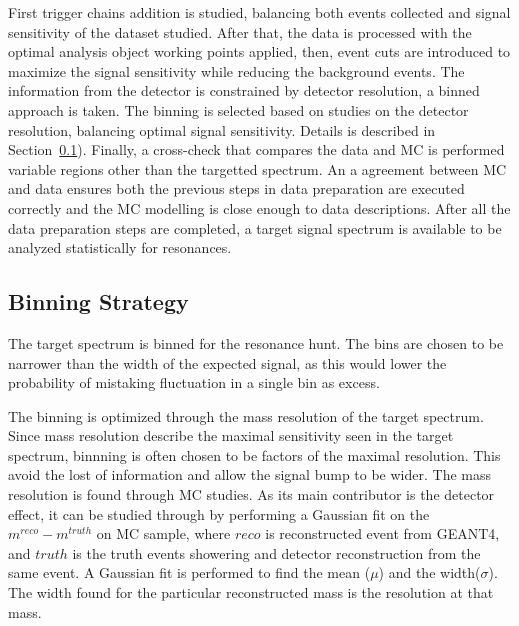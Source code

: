 First trigger chains addition is studied, balancing both events collected and signal sensitivity of the dataset studied. After that, the data is processed with the optimal analysis object working points applied, then, event cuts are introduced to maximize the signal sensitivity while reducing the background events. The information from the detector is constrained by detector resolution, a binned approach is taken. The binning is selected based on studies on the detector resolution, balancing optimal signal sensitivity. Details is described in Section~\ref{sec:binning}). Finally, a cross-check that compares the data and MC is performed variable regions other than the targetted spectrum. An a agreement between MC and data ensures both the previous steps in data preparation are executed correctly and the MC modelling is close enough to data descriptions. After all the data preparation steps are completed, a target signal spectrum is available to be analyzed statistically for resonances. 

\subsection{Binning Strategy} 
\label{sec:binning}

The target spectrum is binned for the resonance hunt. The bins are chosen to be narrower than the width of the expected signal, as this would lower the probability of mistaking fluctuation in a single bin as excess.

The binning is optimized through the mass resolution of the target spectrum. Since mass resolution describe the maximal sensitivity seen in the target spectrum, binnning is often chosen to be factors of the maximal resolution. This avoid the lost of information and allow the signal bump to be wider. 
The mass resolution is found through MC studies. As its main contributor is the detector effect, it can be studied through by performing a Gaussian fit on the $m^{reco}-m^{truth}$ on MC sample, where $reco$ is reconstructed event from GEANT4, and $truth$ is the truth events showering and detector reconstruction from the same event.
A Gaussian fit is performed to find the mean ($\mu$) and the width($\sigma$). The width found for the particular reconstructed mass is the resolution at that mass. 


